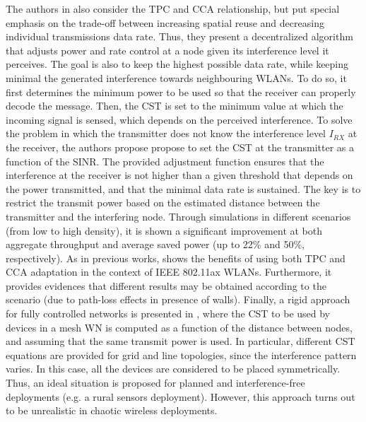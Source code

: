 \documentclass[12pt, a4paper,twoside]{tesi_upf}
\begin{document}
			The authors in \cite{kim2006improving} also consider the TPC and CCA relationship, but put special emphasis on the trade-off between increasing spatial reuse and decreasing individual transmissions data rate. Thus, they present a decentralized algorithm that adjusts power and rate control at a node given its interference level it perceives. The goal is also to keep the highest possible data rate, while keeping minimal the generated interference towards neighbouring WLANs. To do so, it first determines the minimum power to be used so that the receiver can properly decode the message. Then, the CST is set to the minimum value at which the incoming signal is sensed, which depends on the perceived interference. To solve the problem in which the transmitter does not know the interference level $I_{RX}$ at the receiver, the authors propose propose to set the CST at the transmitter as a function of the SINR. The provided adjustment function ensures that the interference at the receiver is not higher than a given threshold that depends on the power transmitted, and that the minimal data rate is sustained. The key is to restrict the transmit power based on the estimated distance between the transmitter and the interfering node. Through simulations in different scenarios (from low to high density), it is shown a significant improvement at both aggregate throughput and average saved power (up to 22\% and 50\%, respectively). As in previous works, \cite{oteri2015improved} shows the benefits of using both TPC and CCA adaptation in the context of IEEE 802.11ax WLANs. Furthermore, it provides evidences that different results may be obtained according to the scenario (due to path-loss effects in presence of walls). Finally, a rigid approach for fully controlled networks is presented in \cite{zhu2004leveraging}, where the CST to be used by devices in a mesh WN is computed as a function of the distance between nodes, and assuming that the same transmit power is used. In particular, different CST equations are provided for grid and line topologies, since the interference pattern varies. In this case, all the devices are considered to be placed symmetrically. Thus, an ideal situation is proposed for planned and interference-free deployments (e.g. a rural sensors deployment). However, this approach turns out to be unrealistic in chaotic wireless deployments.
			
\end{document}
